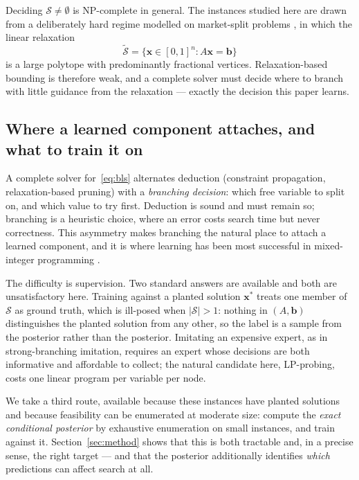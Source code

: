 \documentclass[11pt]{article}
\newcommand{\SOL}{\mathcal{S}}
\begin{document}
Deciding $\SOL\ne\emptyset$ is NP-complete in general. The instances studied here are drawn from a deliberately hard regime modelled on market-split problems \citep{cornuejols1999market, aardal2000market}, in which the linear relaxation
\begin{equation}
\tilde{\SOL} = \{\mathbf{x}\in[0,1]^n : A\mathbf{x}=\mathbf{b}\}
\end{equation}
is a large polytope with predominantly fractional vertices. Relaxation-based bounding is therefore weak, and a complete solver must decide where to branch with little guidance from the relaxation --- exactly the decision this paper learns.

\subsection{Where a learned component attaches, and what to train it on}

A complete solver for~\eqref{eq:bls} alternates deduction (constraint propagation, relaxation-based pruning) with a \emph{branching decision}: which free variable to split on, and which value to try first. Deduction is sound and must remain so; branching is a heuristic choice, where an error costs search time but never correctness. This asymmetry makes branching the natural place to attach a learned component, and it is where learning has been most successful in mixed-integer programming \citep{khalil2016learning, gasse2019exact}.

The difficulty is supervision. Two standard answers are available and both are unsatisfactory here. Training against a planted solution $\mathbf{x}^\ast$ treats one member of $\SOL$ as ground truth, which is ill-posed when $|\SOL|>1$: nothing in $(A,\mathbf{b})$ distinguishes the planted solution from any other, so the label is a sample from the posterior rather than the posterior. Imitating an expensive expert, as in strong-branching imitation, requires an expert whose decisions are both informative and affordable to collect; the natural candidate here, LP-probing, costs one linear program per variable per node.

We take a third route, available because these instances have planted solutions and because feasibility can be enumerated at moderate size: compute the \emph{exact conditional posterior} by exhaustive enumeration on small instances, and train against it. Section~\ref{sec:method} shows that this is both tractable and, in a precise sense, the right target --- and that the posterior additionally identifies \emph{which} predictions can affect search at all.
\end{document}
